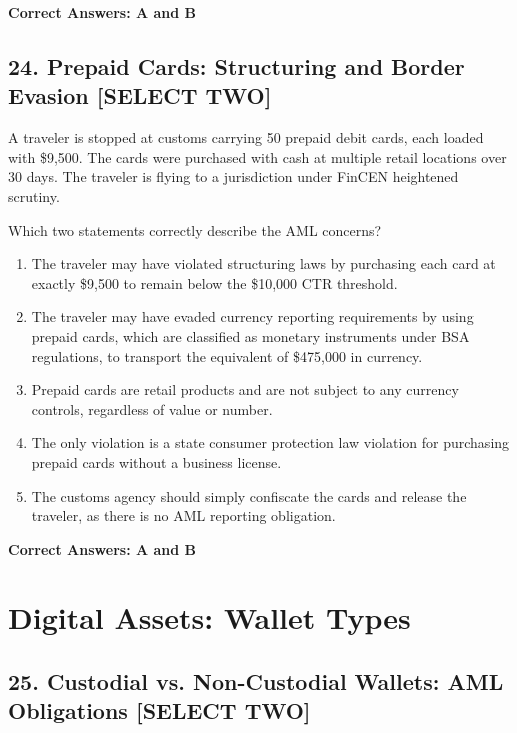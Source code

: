 \documentclass[11pt,a4paper]{article}
\begin{document}
	\textbf{Correct Answers: A and B}
	
	\subsection{24. Prepaid Cards: Structuring and Border Evasion \textnormal{[SELECT TWO]}}
	
	A traveler is stopped at customs carrying 50 prepaid debit cards, each loaded with \$9,500. The cards were purchased with cash at multiple retail locations over 30 days. The traveler is flying to a jurisdiction under FinCEN heightened scrutiny.
	
	Which two statements correctly describe the AML concerns?
	
	\begin{enumerate}[label=\Alph*.]
		\item The traveler may have violated structuring laws by purchasing each card at exactly \$9,500 to remain below the \$10,000 CTR threshold.
		\item The traveler may have evaded currency reporting requirements by using prepaid cards, which are classified as monetary instruments under BSA regulations, to transport the equivalent of \$475,000 in currency.
		\item Prepaid cards are retail products and are not subject to any currency controls, regardless of value or number.
		\item The only violation is a state consumer protection law violation for purchasing prepaid cards without a business license.
		\item The customs agency should simply confiscate the cards and release the traveler, as there is no AML reporting obligation.
	\end{enumerate}
	
	\textbf{Correct Answers: A and B}
	
	\section{Digital Assets: Wallet Types}
	
	\subsection{25. Custodial vs. Non-Custodial Wallets: AML Obligations \textnormal{[SELECT TWO]}}
	
\end{document}
